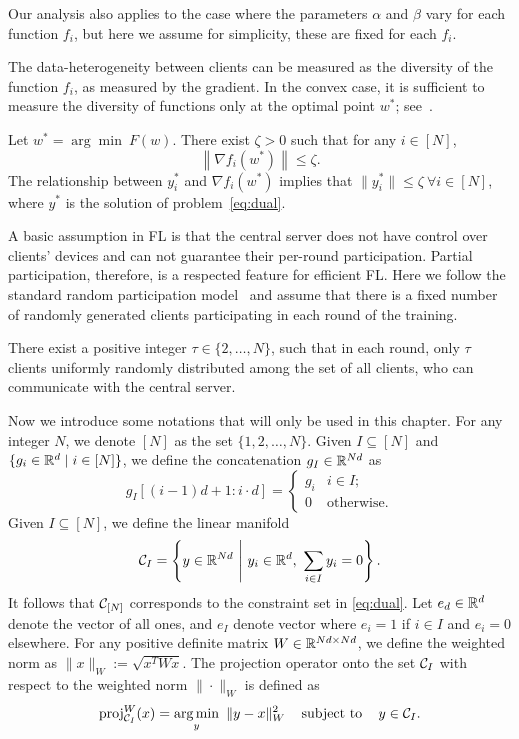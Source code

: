 Our analysis also applies to the case where the parameters $\alpha$ and $\beta$ vary for each function $f_i$, but here we assume for simplicity, these are fixed for each $f_i$. 

The data-heterogeneity between clients can be measured as the diversity of the function $f_i$, as measured by the gradient. In the convex case, it is sufficient to measure the diversity of functions only at the optimal point $w^*$; see~\citet[Assumption~3a]{koloskova2020unified}. 
\begin{assumption} \label{assum:dissimilar}
  Let $w^* = \arg\min~ F(w)$. There exist $\zeta>0$ such that for any $i \in [N]$,
  \[
    \left\|\nabla f_i(w^*) \right\| \leq \zeta.
  \] The relationship between $y_i^*$ and $\nabla f_i(w^*)$ implies that $\|y_i^*\| \leq \zeta ~\forall i \in [N]$, where $y^*$ is the solution of problem~\eqref{eq:dual}. 
\end{assumption}

A basic assumption in FL is that the central server does not have control over clients' devices and can not guarantee their per-round participation. Partial participation, therefore, is a respected feature for efficient FL. Here we follow the standard random participation model~\citep{wang2021field,li2020federated,li2019convergence} and assume that there is a fixed number of randomly generated clients participating in each round of the training.

\begin{assumption} \label{assum:partial}
    There exist a positive integer $\tau \in \{2,\dots,N\}$, such that in each round, only $\tau$ clients uniformly randomly distributed among the set of all clients, who can communicate with the central server.
\end{assumption}

Now we introduce some notations that will only be used in this chapter. For any integer $N$, we denote $[N]$ as the set $\{1,2,\ldots, N\}$. Given $I \subseteq [N]$ and $\{g_i \in \mathbb{R}^d \mid i \in [N]\}$, we define the concatenation $g_I \in \mathbb{R}^{Nd}$ as 
\[
    g_{I}[(i-1)d + 1 : i\cdot d] = 
    \begin{cases} 
      g_i & i \in I ;\\
      0 & \mbox{otherwise} .
    \end{cases}
\]
Given $I \subseteq [N]$, we define the linear manifold 
\[
    \mathcal{C}_I= \left\{y \in\mathbb{R}^{Nd} ~\Bigg|~ y_i\in\mathbb{R}^d, ~\sum_{i\in I}y_i = 0\right\}.
\]
It follows that $\mathcal{C}_{[N]}$ corresponds to the constraint set in \autoref{eq:dual}. Let $e_d \in \mathbb{R}^d$ denote the vector of all ones, and $e_I$ denote vector where $e_i = 1$ if $i \in I$ and $e_i = 0$ elsewhere.  For any positive definite matrix $W\in\mathbb{R}^{Nd\times Nd}$, we define the weighted norm as $\|x\|_W := \sqrt{x^TWx}$. The projection operator onto the set $\mathcal{C}_I$ with respect to the weighted norm $\|\cdot\|_W$ is defined as
\[
    \operatorname{proj}_{\mathcal{C}_I}^{W}(x) = \underset{y}{\textrm{arg}\,{\min}}\enskip \|y-x\|_W^2 \enspace\enspace\mathop{\hbox{\rm subject to}}\enspace\enspace y \in \mathcal{C}_I.
\]


